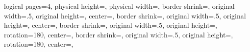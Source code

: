 %
%
%
%
%
%
%

{%
	\edef\pgfpageoptionheight{\the\paperheight}%
	\edef\pgfpageoptionwidth{\the\paperwidth}%
	\edef\pgfpageoptionborder{1pt}%
}%
{
  \pgfpagesphysicalpageoptions%
  {%
    logical pages=4,%
    physical height=\pgfpageoptionheight,%
    physical width=\pgfpageoptionwidth,%
  }%
%
%
  {%
    border shrink=\pgfpageoptionborder,%
    original width=.5\pgfpageoptionheight,%
    original height=\pgfpageoptionwidth,%
	center=\pgfpoint{0\pgfphysicalwidth}{.625\pgfphysicalheight},%
  }%
  {%
    border shrink=\pgfpageoptionborder,%
    original width=.5\pgfpageoptionheight,%
    original height=\pgfpageoptionwidth,%
	center=\pgfpoint{0\pgfphysicalwidth}{.125\pgfphysicalheight},%
  }%
%
%
  {%
	border shrink=\pgfpageoptionborder,%
	original width=.5\pgfpageoptionheight,%
	original height=\pgfpageoptionwidth,%
	rotation=180,%
	center=\pgfpoint{\pgfphysicalwidth}{.875\pgfphysicalheight},%
  }%
  {%
	border shrink=\pgfpageoptionborder,%
	original width=.5\pgfpageoptionheight,%
	original height=\pgfpageoptionwidth,%
	rotation=180,%
	center=\pgfpoint{\pgfphysicalwidth}{.375\pgfphysicalheight},%
	}%
}%